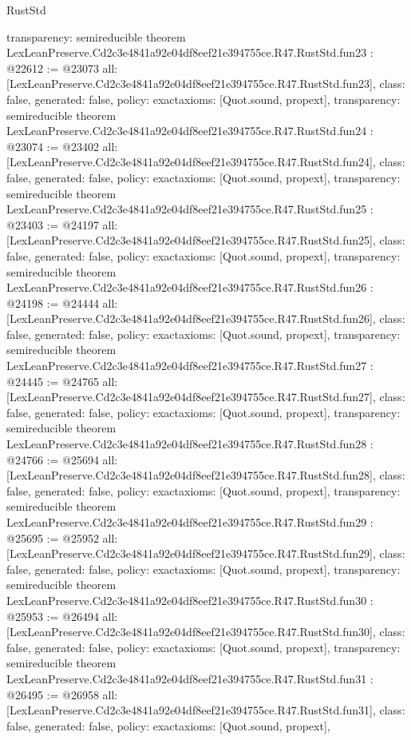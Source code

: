 \begin{lexlean}{RustStd}
\begin{coremodule}
{  transparency: semireducible
}
theorem LexLeanPreserve.Cd2c3e4841a92e04df8eef21e394755ce.R47.RustStd.fun23 : @22612 := @23073 {
  all: [LexLeanPreserve.Cd2c3e4841a92e04df8eef21e394755ce.R47.RustStd.fun23],
  class: false,
  generated: false,
  policy: exact{axioms: [Quot.sound, propext]},
  transparency: semireducible
}
theorem LexLeanPreserve.Cd2c3e4841a92e04df8eef21e394755ce.R47.RustStd.fun24 : @23074 := @23402 {
  all: [LexLeanPreserve.Cd2c3e4841a92e04df8eef21e394755ce.R47.RustStd.fun24],
  class: false,
  generated: false,
  policy: exact{axioms: [Quot.sound, propext]},
  transparency: semireducible
}
theorem LexLeanPreserve.Cd2c3e4841a92e04df8eef21e394755ce.R47.RustStd.fun25 : @23403 := @24197 {
  all: [LexLeanPreserve.Cd2c3e4841a92e04df8eef21e394755ce.R47.RustStd.fun25],
  class: false,
  generated: false,
  policy: exact{axioms: [Quot.sound, propext]},
  transparency: semireducible
}
theorem LexLeanPreserve.Cd2c3e4841a92e04df8eef21e394755ce.R47.RustStd.fun26 : @24198 := @24444 {
  all: [LexLeanPreserve.Cd2c3e4841a92e04df8eef21e394755ce.R47.RustStd.fun26],
  class: false,
  generated: false,
  policy: exact{axioms: [Quot.sound, propext]},
  transparency: semireducible
}
theorem LexLeanPreserve.Cd2c3e4841a92e04df8eef21e394755ce.R47.RustStd.fun27 : @24445 := @24765 {
  all: [LexLeanPreserve.Cd2c3e4841a92e04df8eef21e394755ce.R47.RustStd.fun27],
  class: false,
  generated: false,
  policy: exact{axioms: [Quot.sound, propext]},
  transparency: semireducible
}
theorem LexLeanPreserve.Cd2c3e4841a92e04df8eef21e394755ce.R47.RustStd.fun28 : @24766 := @25694 {
  all: [LexLeanPreserve.Cd2c3e4841a92e04df8eef21e394755ce.R47.RustStd.fun28],
  class: false,
  generated: false,
  policy: exact{axioms: [Quot.sound, propext]},
  transparency: semireducible
}
theorem LexLeanPreserve.Cd2c3e4841a92e04df8eef21e394755ce.R47.RustStd.fun29 : @25695 := @25952 {
  all: [LexLeanPreserve.Cd2c3e4841a92e04df8eef21e394755ce.R47.RustStd.fun29],
  class: false,
  generated: false,
  policy: exact{axioms: [Quot.sound, propext]},
  transparency: semireducible
}
theorem LexLeanPreserve.Cd2c3e4841a92e04df8eef21e394755ce.R47.RustStd.fun30 : @25953 := @26494 {
  all: [LexLeanPreserve.Cd2c3e4841a92e04df8eef21e394755ce.R47.RustStd.fun30],
  class: false,
  generated: false,
  policy: exact{axioms: [Quot.sound, propext]},
  transparency: semireducible
}
theorem LexLeanPreserve.Cd2c3e4841a92e04df8eef21e394755ce.R47.RustStd.fun31 : @26495 := @26958 {
  all: [LexLeanPreserve.Cd2c3e4841a92e04df8eef21e394755ce.R47.RustStd.fun31],
  class: false,
  generated: false,
  policy: exact{axioms: [Quot.sound, propext]},
}
\end{coremodule}
\end{lexlean}
